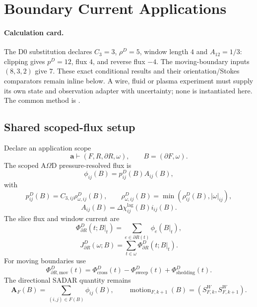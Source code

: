 \section{Boundary Current Applications}\label{manual:boundary-current-applications}

\paragraph{Calculation card.}
The D0 substitution declares \(C_3=3\), \(\rho^D=5\), window length \(4\)
and \(A_{12}=1/3\): clipping gives \(p^D=12\), flux \(4\), and reverse
flux \(-4\). The moving-boundary inputs \((8,3,2)\) give \(7\).
These exact conditional results and their orientation/Stokes comparators
remain inline below. A wire, fluid or plasma experiment must supply its own
state and observation adapter with uncertainty; none is instantiated here.
The common method is .



\subsection{Shared scoped-flux setup}\label{manual:boundary-current:shared-setup}
Declare an application scope
\[
\mathbf a\vdash(F,R,\partial R,\omega),
\qquad
B=(\partial F,\omega).
\]
The scoped A\(\Omega\)D pressure-resolved flux is
\[
\phi_{ij}(B)=p^D_{ij}(B)A_{ij}(B),
\]
with
\[
p^D_{ij}(B)=C_{3,ij}\rho^D_{\omega,ij}(B),
\qquad
\rho^D_{\omega,ij}(B)=\min(\rho^D_{ij}(B),|\omega|_{ij}),
\]
\[
A_{ij}(B)=\Delta\chi^{\mathrm{lag}}_{ij}(B)i_{ij}(B).
\]
The slice flux and window current are
\[
\Phi^D_{\partial R}(t;B|_t)
=
\sum_{e\in\partial R(t)}\phi_e(B|_t),
\]
\[
J^D_{\partial R}(\omega;B)
=
\sum_{t\in\omega}\Phi^D_{\partial R}(t;B|_t).
\]
For moving boundaries use
\[
\Phi^D_{\partial R,\mathrm{mov}}(t)
=
\Phi^D_{\mathrm{cross}}(t)
-
\Phi^D_{\mathrm{sweep}}(t)
+
\Phi^D_{\mathrm{shedding}}(t).
\]
The directional SADAR quantity remains
\[
\mathbf A_F(B)=\sum_{(i,j)\in F(B)}\phi_{ij}(B),
\qquad
\operatorname{motion}_{F,k+1}(B)=(S^W_{F,k},S^W_{F,k+1}).
\]

